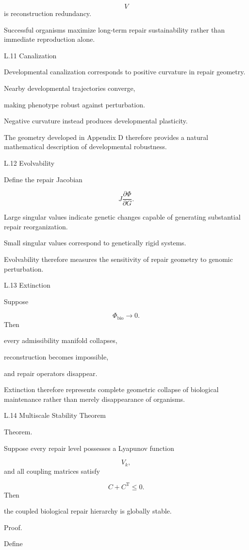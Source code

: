 \documentclass[12pt,oneside]{article}
\theoremstyle{plain}
\theoremstyle{definition}
\theoremstyle{remark}
\begin{document}
\[
V
\]
is reconstruction redundancy.

Successful organisms maximize long-term repair sustainability rather than immediate reproduction alone.


L.11 Canalization

Developmental canalization corresponds to positive curvature in repair geometry.

Nearby developmental trajectories converge,

making phenotype robust against perturbation.

Negative curvature instead produces developmental plasticity.

The geometry developed in Appendix D therefore provides a natural mathematical description of developmental robustness.


L.12 Evolvability

Define the repair Jacobian

\[
J
\frac{\partial\Phi}
{\partial G}.
\]

Large singular values indicate genetic changes capable of generating substantial repair reorganization.

Small singular values correspond to genetically rigid systems.

Evolvability therefore measures the sensitivity of repair geometry to genomic perturbation.


L.13 Extinction

Suppose

\[
\Phi_{\mathrm{bio}}
\rightarrow0.
\]
Then

every admissibility manifold collapses,

reconstruction becomes impossible,

and repair operators disappear.

Extinction therefore represents complete geometric collapse of biological maintenance rather than merely disappearance of organisms.


L.14 Multiscale Stability Theorem

Theorem.

Suppose every repair level possesses a Lyapunov function

\[
V_k,
\]
and all coupling matrices satisfy

\[
C+C^{\mathrm T}
\le0.
\]
Then

the coupled biological repair hierarchy is globally stable.

Proof.

Define
\end{document}
